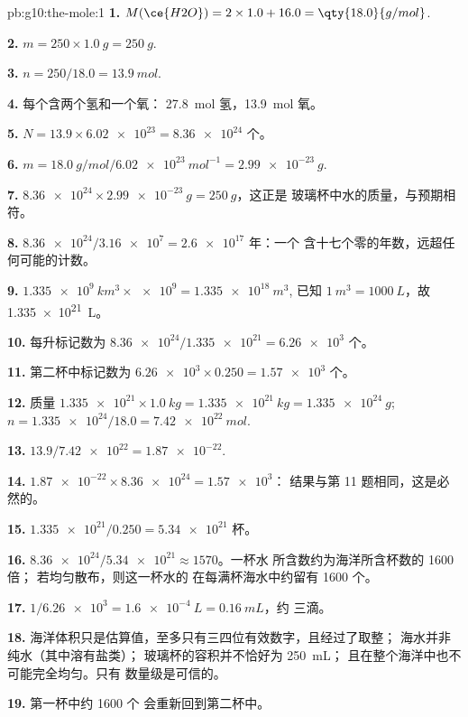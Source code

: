 \begin{solution}{pb:g10:the-mole:1}
\textbf{1.} $M(\ce{H2O}) = 2 \times 1.0 + 16.0 = \qty{18.0}{g/mol}$.

\textbf{2.} $m = 250 \times \qty{1.0}{g} = \qty{250}{g}$.

\textbf{3.} $n = 250 / 18.0 = \qty{13.9}{mol}$.

\textbf{4.} 每个含两个氢和一个氧：
\qty{27.8}{mol} 氢，\qty{13.9}{mol} 氧。

\textbf{5.} $N = 13.9 \times \num{6.02e23} = \num{8.36e24}$ 个。

\textbf{6.} $m = \qty{18.0}{g/mol} / \qty{6.02e23}{mol^{-1}} =
\qty{2.99e-23}{g}$.

\textbf{7.} $\num{8.36e24} \times \qty{2.99e-23}{g} = \qty{250}{g}$，这正是
玻璃杯中水的质量，与预期相符。

\textbf{8.} $\num{8.36e24} / \num{3.16e7} = \num{2.6e17}$ 年：一个
含十七个零的年数，远超任何可能的计数。

\textbf{9.} $\qty{1.335e9}{km^3} \times \num{e9} = \qty{1.335e18}{m^3}$,
已知 $\qty{1}{m^3} = \qty{1000}{L}$，故 \qty{1.335e21}{L}。

\textbf{10.} 每升标记数为 $\num{8.36e24} / \num{1.335e21} = \num{6.26e3}$
个。

\textbf{11.} 第二杯中标记数为 $\num{6.26e3} \times 0.250 = \num{1.57e3}$
个。

\textbf{12.} 质量 $\num{1.335e21} \times \qty{1.0}{kg} =
\qty{1.335e21}{kg} = \qty{1.335e24}{g}$; $n = \num{1.335e24} / 18.0 =
\qty{7.42e22}{mol}$.

\textbf{13.} $13.9 / \num{7.42e22} = \num{1.87e-22}$.

\textbf{14.} $\num{1.87e-22} \times \num{8.36e24} = \num{1.57e3}$：
结果与第 11 题相同，这是必然的。

\textbf{15.} $\num{1.335e21} / 0.250 = \num{5.34e21}$ 杯。

\textbf{16.} $\num{8.36e24} / \num{5.34e21} \approx 1570$。一杯水
所含数约为海洋所含杯数的 1600 倍；
若均匀散布，则这一杯水的
在每满杯海水中约留有 1600 个。

\textbf{17.} $1 / \num{6.26e3} = \qty{1.6e-4}{L} = \qty{0.16}{mL}$，约
三滴。

\textbf{18.} 海洋体积只是估算值，至多只有三四位有效数字，且经过了取整；
海水并非纯水（其中溶有盐类）；
玻璃杯的容积并不恰好为 \qty{250}{mL}；
且在整个海洋中也不可能完全均匀。只有
数量级是可信的。

\textbf{19.} 第一杯中约 1600 个
会重新回到第二杯中。
\end{solution}
